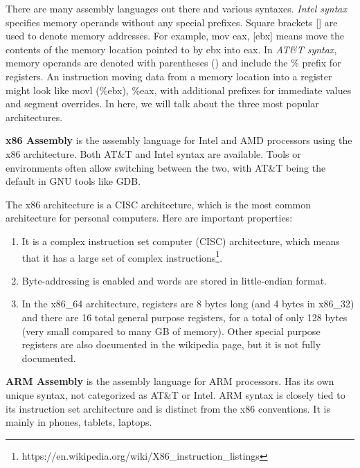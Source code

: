 There are many assembly languages out there and various syntaxes. \textit{Intel syntax} specifies memory operands without any special prefixes. Square brackets [] are used to denote memory addresses. For example, mov eax, [ebx] means move the contents of the memory location pointed to by ebx into eax. In \textit{AT\&T syntax}, memory operands are denoted with parentheses () and include the \% prefix for registers. An instruction moving data from a memory location into a register might look like movl (\%ebx), \%eax, with additional prefixes for immediate values and segment overrides. In here, we will talk about the three most popular architectures. 

\begin{definition}[x86]
  \textbf{x86 Assembly} is the assembly language for Intel and AMD processors using the x86 architecture. Both AT\&T and Intel syntax are available. Tools or environments often allow switching between the two, with AT\&T being the default in GNU tools like GDB.

  The x86 architecture is a CISC architecture, which is the most common architecture for personal computers. Here are important properties: 
  \begin{enumerate} 
    \item It is a complex instruction set computer (CISC) architecture, which means that it has a large set of complex instructions\footnote{https://en.wikipedia.org/wiki/X86\_instruction\_listings}. 
    \item Byte-addressing is enabled and words are stored in little-endian format.
    \item In the x86\_64 architecture, registers are 8 bytes long (and 4 bytes in x86\_32) and there are 16 total general purpose registers, for a total of only 128 bytes (very small compared to many GB of memory). Other special purpose registers are also documented in the wikipedia page, but it is not fully documented. 
  \end{enumerate}
\end{definition}

\begin{definition}[ARM]
  \textbf{ARM Assembly} is the assembly language for ARM processors. Has its own unique syntax, not categorized as AT\&T or Intel. ARM syntax is closely tied to its instruction set architecture and is distinct from the x86 conventions. It is mainly in phones, tablets, laptops. 
\end{definition}

\begin{definition}[RISC-V]
  
\end{definition}

